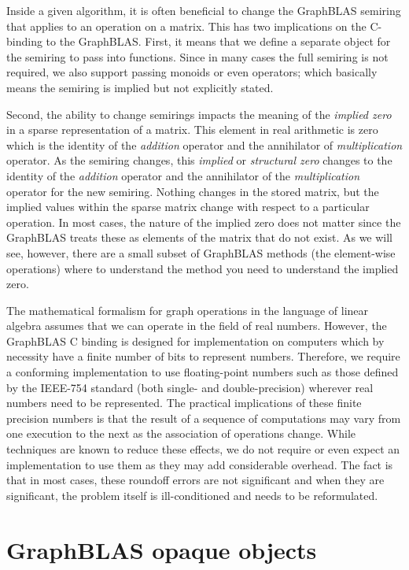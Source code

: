 Inside a given algorithm, it is often beneficial to change the GraphBLAS semiring
that applies to an operation on a matrix.  This has two 
implications on the C-binding to the GraphBLAS.  First,
it means that we define a separate object for the semiring 
to pass into functions.  Since in many cases the full
semiring is not required, we also support passing monoids or
even operators; which basically means the semiring is implied but not 
explicitly stated.

Second, the ability to change semirings impacts the meaning of 
the \emph{implied zero} in a sparse representation of a matrix.
This element in real arithmetic is zero which is the 
identity of the \emph{addition} operator and the annihilator of
\emph{multiplication} operator.   As the semiring changes, this 
\emph{implied} or \emph{structural zero} changes to the identity of 
the \emph{addition} operator and the annihilator of the \emph{multiplication} 
operator for the new semiring.   Nothing changes in the
stored matrix, but the implied values within the sparse matrix change
with respect to a particular operation.  In most cases, the nature
of the implied zero does not matter since the GraphBLAS treats these
as elements of the matrix that do not exist.  As we will see, however,
there are a small subset of GraphBLAS methods 
(the element-wise operations) where to understand 
the method you need to understand the implied zero.

The mathematical formalism for graph operations in the language of 
linear algebra assumes that we can operate in the field of real numbers. 
However, the GraphBLAS C binding is designed for implementation on computers 
which by necessity have a finite number of bits to represent numbers. 
Therefore, we require a conforming implementation to use floating-point 
numbers such as those defined by the IEEE-754 standard (both single- and double-precision) 
wherever real numbers need to be represented. The practical implications of 
these finite precision numbers is that the result of a sequence of 
computations may vary from one execution to the next as the association 
of operations change.  While techniques are known to 
reduce these effects, we do not require or even expect an implementation 
to use them as they may add considerable overhead. The fact is that in most 
cases, these roundoff errors are not significant and when they are significant, 
the problem itself is ill-conditioned and needs to be reformulated.

\section{GraphBLAS opaque objects}

